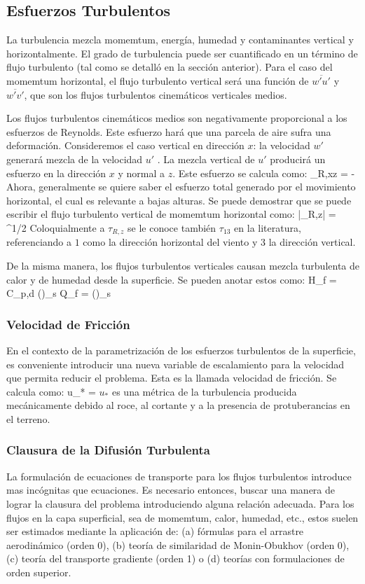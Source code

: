 \subsection{Esfuerzos Turbulentos}
La turbulencia mezcla momemtum, energía, humedad y contaminantes vertical y horizontalmente. El grado de turbulencia puede ser cuantificado en un término de flujo turbulento (tal como se detalló en la sección anterior). Para el caso del momemtum horizontal, el flujo turbulento vertical será una función de $\overline{w'u'}$ y $\overline{w'v'}$, que son los flujos turbulentos cinemáticos verticales medios.

Los flujos turbulentos cinemáticos medios son negativamente proporcional a los esfuerzos de Reynolds. Este esfuerzo hará que una parcela de aire sufra una deformación. Consideremos el caso vertical en dirección $x$: la velocidad $w'$ generará mezcla de la velocidad $u'$ . La mezcla vertical de $u'$ producirá un esfuerzo en la dirección $x$ y normal a $z$. Este esfuerzo se calcula como:
\be 
\tau_{R,xz} = - \rho {}
\ee
Ahora, generalmente se quiere saber el esfuerzo total generado por el movimiento horizontal, el cual es relevante a bajas alturas. Se puede demostrar que se puede escribir el flujo turbulento vertical de momemtum horizontal como:
\be 
|\tau_{R,z}| = ^{1/2}
\ee
Coloquialmente a $\tau_{R,z}$ se le conoce también $\tau_{13}$ en la literatura, referenciando a $1$ como la dirección horizontal del viento y $3$ la dirección vertical.

De la misma manera, los flujos turbulentos verticales causan mezcla turbulenta de calor y de humedad desde la superficie. Se pueden anotar estos como:
\be H_f = \rho C_{p,d} ()_s \ee
\be Q_f = \rho ()_s \ee
\subsubsection{Velocidad de Fricción}
En el contexto de la parametrización de los esfuerzos turbulentos de la superficie, es conveniente introducir una nueva variable de escalamiento para la velocidad que permita reducir el problema. Esta es la llamada velocidad de fricción. Se calcula como:
\be u_* =  \ee
$u_*$ es una métrica de la turbulencia producida mecánicamente debido al roce, al cortante y a la presencia de protuberancias en el terreno.
\subsubsection{Clausura de la Difusión Turbulenta}
La formulación de ecuaciones de transporte para los flujos turbulentos introduce mas incógnitas que ecuaciones. Es necesario entonces, buscar una manera de lograr la clausura del problema introduciendo alguna relación adecuada. Para los flujos en la capa superficial, sea de momemtum, calor, humedad, etc., estos suelen ser estimados mediante la aplicación de: (a) fórmulas para el arrastre aerodinámico (orden 0), (b) teoría de similaridad de Monin-Obukhov (orden 0), (c) teoría del transporte gradiente (orden 1) o (d) teorías con formulaciones de orden superior.

